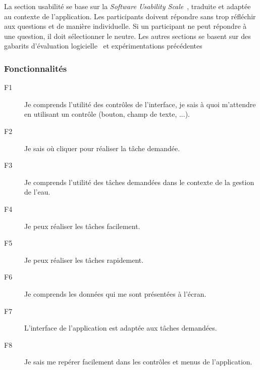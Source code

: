\documentclass[a4paper, 11pt]{article}
\begin{document}
        La section usabilité se base sur la \emph{Software Usability Scale}~\cite{sus, usagov}, traduite et adaptée au contexte de l'application. Les participants doivent répondre sans trop réfléchir aux questions et de manière individuelle. Si un participant ne peut répondre à une question, il doit sélectionner le neutre. Les autres sections se basent sur des gabarits d'évaluation logicielle~\cite{ssi} et expérimentations précédentes~\cite{richardbastin}


        \subsubsection*{Fonctionnalités}
            \begin{description}
                \item[F1] Je comprends l'utilité des contrôles de l'interface, je sais à quoi m'attendre en utilisant un contrôle (bouton, champ de texte, ...).
                \item[F2] Je sais où cliquer pour réaliser la tâche demandée.
                \item[F3] Je comprends l'utilité des tâches demandées dans le contexte de la gestion de l'eau.
                \item[F4] Je peux réaliser les tâches facilement.
                \item[F5] Je peux réaliser les tâches rapidement.
                \item[F6] Je comprends les données qui me sont présentées à l'écran.
                \item[F7] L'interface de l'application est adaptée aux tâches demandées.
                \item[F8] Je sais me repérer facilement dans les contrôles et menus de l'application.
            \end{description}
\end{document}
